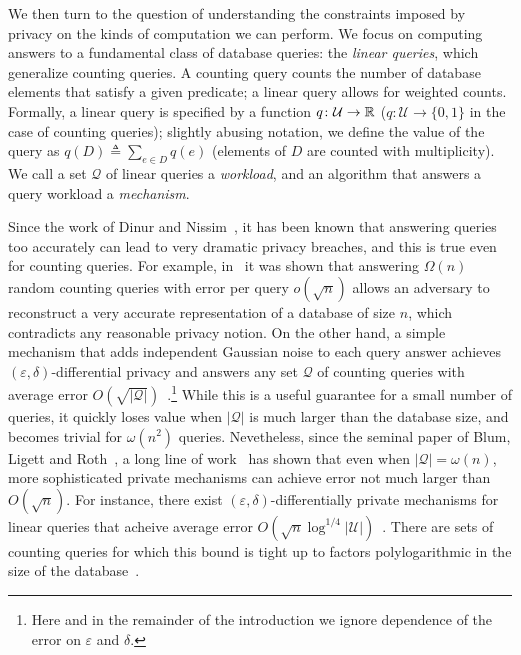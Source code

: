 \documentclass{article}
\newcommand{\eps}{\varepsilon}
\newcommand{\univ}{U}
\newcommand{\maps}{\colon} \DeclareMathOperator{\disc}{disc}
\renewcommand{\univ}{\mathcal{U}}
\newcommand{\quer}{\mathcal{Q}}
\newcommand{\row}{e}
\begin{document}
We then turn to the question of understanding the constraints imposed
by privacy on the kinds of computation we can perform. We focus on
computing answers to a fundamental class of database queries: the
\emph{linear queries}, which generalize counting queries.  A counting
query counts the number of database elements that satisfy a given
predicate; a linear query allows for weighted
counts. Formally, a linear query is specified by a function
$q\maps\univ \to \R$ ($q\maps \univ \to \{0, 1\}$ in the case of
counting queries); slightly abusing notation, we define the value of
the query as $q(D) \triangleq \sum_{\row \in D}{q(e)}$ (elements of
$D$ are counted with multiplicity). We call a set $\quer$ of linear
queries a \emph{workload}, and an algorithm that answers a query
workload a \emph{mechanism}. 

Since the work of Dinur and
Nissim~\cite{DN}, it has been known that answering queries too
accurately can lead to very dramatic privacy breaches, and this is
true even for counting queries. For example, in~\cite{DN,DMT07} it was
shown that answering $\Omega(n)$ random counting queries with error
per query $o(\sqrt{n})$ allows an adversary to reconstruct a very
accurate representation of a database of size $n$, which contradicts
any reasonable privacy notion. On the other hand, a simple mechanism
that adds independent Gaussian noise to each query answer achieves
$(\eps, \delta)$-differential privacy and answers any set $\quer$ of
counting queries with average error
$O(\sqrt{|\quer|})$~\cite{DN,DworkN04,DMNS}.\footnote{Here and in the
  remainder of the introduction we ignore dependence of the error on
  $\eps$ and $\delta$.} While this is a useful guarantee for a small
number of queries, it quickly loses value when $|\quer|$ is much
larger than the database size, and becomes trivial for $\omega(n^2)$
queries. Nevetheless, since the seminal paper of Blum, Ligett and
Roth~\cite{BLR}, a long line of
work~\cite{DworkNRRV09,DworkRV10,RothR10,HardtR10,GuptaHRU11,HardtLM12,GuptaRU11}
has shown that even when $|\quer| = \omega(n)$, more sophisticated
private mechanisms can achieve error not much larger than
$O(\sqrt{n})$. For instance, there exist $(\eps,
\delta)$-differentially private mechanisms for linear queries that
acheive average error
$O(\sqrt{n}\log^{1/4}|\univ|)$~\cite{GuptaRU11}. There are sets of
counting queries for which this bound is tight up to factors
polylogarithmic in the size of the database~\cite{BunUV13}.
\end{document}
